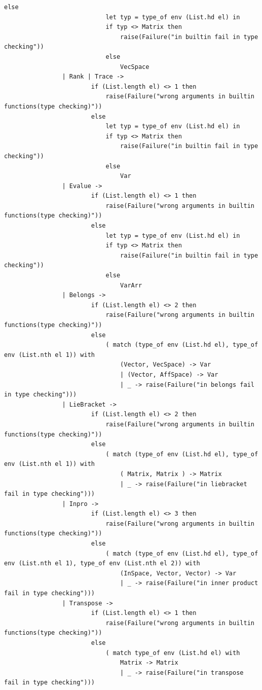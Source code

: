\documentclass[12pt]{article} %
\begin{document}
\begin{lstlisting}[style=appendix, caption=check.ml]
                        else
                            let typ = type_of env (List.hd el) in
                            if typ <> Matrix then
                                raise(Failure("in builtin fail in type checking"))
                            else
                                VecSpace
                | Rank | Trace ->
                        if (List.length el) <> 1 then
                            raise(Failure("wrong arguments in builtin functions(type checking)"))
                        else
                            let typ = type_of env (List.hd el) in
                            if typ <> Matrix then
                                raise(Failure("in builtin fail in type checking"))
                            else
                                Var
                | Evalue ->
                        if (List.length el) <> 1 then
                            raise(Failure("wrong arguments in builtin functions(type checking)"))
                        else
                            let typ = type_of env (List.hd el) in
                            if typ <> Matrix then
                                raise(Failure("in builtin fail in type checking"))
                            else
                                VarArr
                | Belongs ->
                        if (List.length el) <> 2 then
                            raise(Failure("wrong arguments in builtin functions(type checking)"))
                        else
                            ( match (type_of env (List.hd el), type_of env (List.nth el 1)) with
                                (Vector, VecSpace) -> Var
                                | (Vector, AffSpace) -> Var
                                | _ -> raise(Failure("in belongs fail in type checking")))
                | LieBracket ->
                        if (List.length el) <> 2 then
                            raise(Failure("wrong arguments in builtin functions(type checking)"))
                        else
                            ( match (type_of env (List.hd el), type_of env (List.nth el 1)) with
                                ( Matrix, Matrix ) -> Matrix
                                | _ -> raise(Failure("in liebracket fail in type checking")))
                | Inpro ->
                        if (List.length el) <> 3 then
                            raise(Failure("wrong arguments in builtin functions(type checking)"))
                        else
                            ( match (type_of env (List.hd el), type_of env (List.nth el 1), type_of env (List.nth el 2)) with
                                (InSpace, Vector, Vector) -> Var
                                | _ -> raise(Failure("in inner product fail in type checking")))
                | Transpose ->
                        if (List.length el) <> 1 then
                            raise(Failure("wrong arguments in builtin functions(type checking)"))
                        else
                            ( match type_of env (List.hd el) with
                                Matrix -> Matrix
                                | _ -> raise(Failure("in transpose fail in type checking")))
                            

\end{lstlisting}
\end{document}
